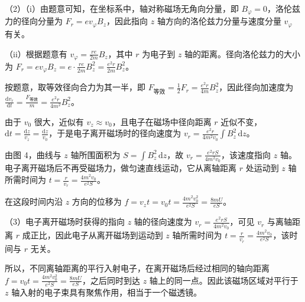 \documentclass[\gkver]{gaokaozhenti}
\begin{document}
\begin{enumerate}
{（2）（i）由题意可知，在坐标系中，轴对称磁场无角向分量，即 $B_{\varphi} = 0$，洛伦兹力的径向分量为 $F_{r} = ev_{\varphi}B_{z}$，因此指向 $z$ 轴方向的洛伦兹力分量与速度分量 $v_{\varphi}$ 有关。

（ii）根据题意有 $v_{\varphi} = \frac{re}{2m}B_{z}$，其中 $r$ 为电子到 $z$ 轴的距离。径向洛伦兹力的大小为 $F_{r} = ev_{\varphi}B_{z} = e\cdot\frac{re}{2m}B_{z}^{2} = \frac{e^{2}r}{2m}B_{z}^{2}$。

按题意，取等效径向合力为其一半，即 $F_{\text{等效}} = \frac{1}{2}F_{r} = \frac{e^{2}r}{4m}B_{z}^{2}$，因此径向加速度为 $\frac{\mathrm{d}v_{r}}{\mathrm{d}t} = \frac{F_{\text{等效}}}{m} = \frac{e^{2}r}{4m^{2}}B_{z}^{2}$。

由于 $v_{0}$ 很大，近似有 $v_{z} \approx v_{0}$，且电子在磁场中径向距离 $r$ 近似不变，$\mathrm{d}t = \frac{\mathrm{d}z}{v_{z}} = \frac{\mathrm{d}z}{v_{0}}$，于是电子离开磁场时的径向速度为 $v_{r} = \frac{e^{2}r}{4m^{2}v_{0}}\int B_{z}^{2}\,\mathrm{d}z$。

由图 4，曲线与 $z$ 轴所围面积为 $S = \int B_{z}^{2}\,\mathrm{d}z$，故 $v_{r} = \frac{e^{2}rS}{4m^{2}v_{0}}$，该速度指向 $z$ 轴。电子离开磁场后不再受磁场力，做匀速直线运动，它从离轴距离 $r$ 处运动到 $z$ 轴所需时间为 $t = \frac{r}{v_{r}} = \frac{4m^{2}v_{0}}{e^{2}S}$。

在这段时间内沿 $z$ 方向的位移为 $f = v_{z}t = v_{0}t = \frac{4m^{2}v_{0}^{2}}{e^{2}S} = \frac{8mU}{eS}$。

（3）电子离开磁场时获得的指向 $z$ 轴的径向速度为 $v_{r} = \frac{e^{2}rS}{4m^{2}v_{0}}$，可见 $v_{r}$ 与离轴距离 $r$ 成正比，因此电子从离开磁场到运动到 $z$ 轴所需时间为 $t = \frac{r}{v_{r}} = \frac{4m^{2}v_{0}}{e^{2}S}$，该时间与 $r$ 无关。

所以，不同离轴距离的平行入射电子，在离开磁场后经过相同的轴向距离 $f = v_{0}t = \frac{4m^{2}v_{0}^{2}}{e^{2}S} = \frac{8mU}{eS}$，之后同时到达 $z$ 轴上的同一点。因此该磁场区域对平行于 $z$ 轴入射的电子束具有聚焦作用，相当于一个磁透镜。
}

\end{enumerate}
\end{document}
